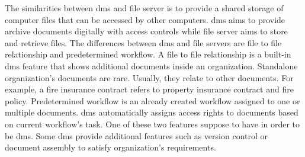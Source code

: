 \clearpage

The similarities between \gls{dms} and file server is to provide a shared storage of computer files that can be accessed by other computers.
\gls{dms} aims to provide archive documents digitally with access controls while file server aims to store and retrieve files.
The differences between \gls{dms} and file servers are file to file relationship and predetermined workflow.
A file to file relationship is a built-in \gls{dms} feature that shows additional documents inside an organization.
Standalone organization's documents are rare.
Usually, they relate to other documents.
For example, a fire insurance contract refers to property insurance contract and fire policy.
Predetermined workflow is an already created workflow assigned to one or multiple documents.
\gls{dms} automatically assigns access rights to documents based on current workflow's task.
One of these two features suppose to have in order to be \gls{dms}.
Some \gls{dms} provide additional features such as version control or document assembly to satisfy organization's requirements.